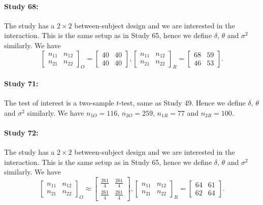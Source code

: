 \documentclass[11pt]{article}
\theoremstyle{definition}
\theoremstyle{custom}
\begin{document}
  \paragraph{Study 68: \citet{Risen:2008jo}}
  The study has a $2 \times 2$ between-subject design and we are interested in the interaction. This is the same setup as in Study 65, hence we define $\delta$, $\theta$ and $\sigma^2$ similarly. We have
  \[
  \begin{bmatrix}
  n_{11} & n_{12} \\
  n_{21} & n_{22}
  \end{bmatrix}_O = \begin{bmatrix}
  40 & 40 \\
  40 & 40
  \end{bmatrix}, \begin{bmatrix}
  n_{11} & n_{12} \\
  n_{21} & n_{22}
  \end{bmatrix}_R = \begin{bmatrix}
  68 & 59 \\
  46 & 53
  \end{bmatrix}.
  \]

  \paragraph{Study 71: \citet{Stanovich:2008cm}}
  The test of interest is a two-sample $t$-test, same as Study 49. Hence we define $\delta$, $\theta$ and $\sigma^2$ similarly. We have $n_{1O} = 116$, $n_{2O} = 259$, $n_{1R} = 77$ and $n_{2R} = 100$.

  \paragraph{Study 72: \citet{Blankenship:2008ko}}
  The study has a $2 \times 2$ between-subject design and we are interested in the interaction. This is the same setup as in Study 65, hence we define $\delta$, $\theta$ and $\sigma^2$ similarly. We have
  \[
  \begin{bmatrix}
  n_{11} & n_{12} \\
  n_{21} & n_{22}
  \end{bmatrix}_O \approx \begin{bmatrix}
  \frac{261}{4} & \frac{261}{4} \\
  \frac{261}{4} & \frac{261}{4}
  \end{bmatrix}, \begin{bmatrix}
  n_{11} & n_{12} \\
  n_{21} & n_{22}
  \end{bmatrix}_R = \begin{bmatrix}
  64 & 61 \\
  62 & 64
  \end{bmatrix}.
  \]
\end{document}
